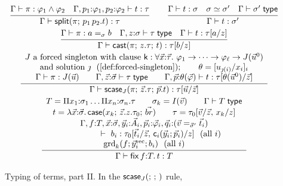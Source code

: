 \begin{figure}[tp]
\small
\[
\begin{array}{c}
\rul{\Gamma \vdash \pi : \varphi_1 \wedge \varphi_2 \quad
     \Gamma, p_1{:}\varphi_1, p_2{:}\varphi_2 \vdash t : \tau}
    {\Gamma \vdash \tsplit{\pi}{p_1\,p_2.t} : \tau}
\qquad
\rul{\Gamma \vdash t : \sigma \quad \sigma \conv \sigma' \quad
     \Gamma \vdash \sigma' \styp}
    {\Gamma \vdash t : \sigma'}
\\[2.2ex]
\rul{\Gamma \vdash \pi : a =_{\sigma} b \quad
     \Gamma, z{:}\sigma \vdash \tau \styp \quad
     \Gamma \vdash t : \subst{\tau}{a}{z}}
    {\Gamma \vdash \tcast{\pi}{z.\tau}{t} : \subst{\tau}{b}{z}}
\\[2.2ex]
\rul{\begin{array}{c}
     J \text{ a forced singleton with clause }
     \wcns{k} : \forall \tup{x}{:}\tup{\tau}.\ \varphi_1 \to \dots \to
       \varphi_\ell \to J(\tup{u}^0)\\
     \text{and solution } \jmath \ \ (\text{\cref{def:forced-singleton}});
     \qquad \theta = [u_{\jmath(i)}/x_i]_i \\
     \Gamma \vdash \pi : J(\tup{u}) \qquad
     \Gamma, \tup{z}{:}\tup{\sigma} \vdash \tau \styp \qquad
     \Gamma, \tup{p}{:}\theta(\tup{\varphi}) \vdash t :
       \tau[\theta(\tup{u}^0)/\tup{z}]
     \end{array}}
    {\Gamma \vdash \tscase{J}{\pi}{\tup{z}.\tau}{\tup{p}.t} :
       \tau[\tup{u}/\tup{z}]}
\\[2.2ex]
\rul{\begin{array}{c}
     T = \Pi x_1{:}\sigma_1 \dots \Pi x_n{:}\sigma_n.\tau \qquad
     \sigma_k = I(\tup{v}) \qquad \Gamma \vdash T \styp \\
     t = \lambda \tup{x}{:}\tup{\sigma}.\,
         \tcase{x_k}{\tup{z}.z.\tau_0}{\tup{br}} \qquad
     \tau = \tau_0[\tup{v}/\tup{z},\, x_k/z] \\
     \Gamma, f{:}T, \tup{x}{:}\tup{\sigma},
       \tup{y}_i{:}\tup{A}_i, \tup{p}_i{:}\tup{\varphi}_i,
       \tup{q}_i{:}(\tup{v} =_{\tup{\sigma}'} \tup{t}_i) \\
       \qquad\qquad \vdash\ b_i : \tau_0[\tup{t}_i/\tup{z},\,
         \wcns{c}_i(\tup{y}_i;\tup{p}_i)/z]
       \ \ (\text{all } i) \\
     \mathrm{grd}_k(f; \tup{y}_i^{\mathrm{rec}}; b_i) \ \ (\text{all } i)
     \end{array}}
    {\Gamma \vdash \tfix\,f{:}T.\,t : T}
\end{array}
\]
\caption{Typing of terms, part II.  In the $\mathsf{scase}_{J}(;\,;\,)$ rule,
}
\end{figure}
